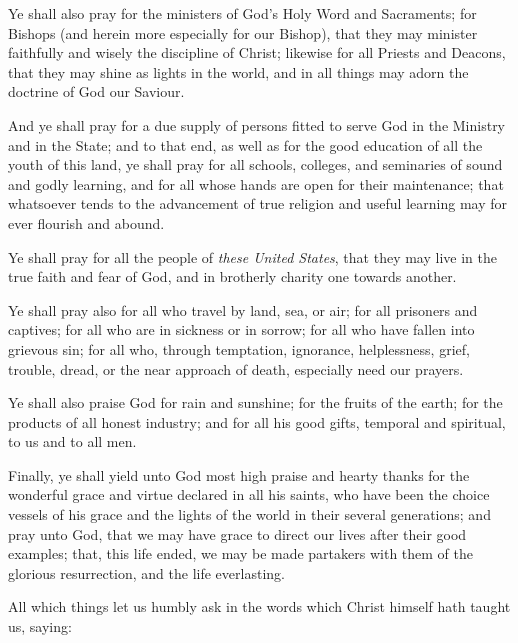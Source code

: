 Ye shall also pray for the ministers of God’s Holy Word and Sacraments; for Bishops (and herein more especially for our Bishop), that they may minister faithfully and wisely the discipline of Christ; likewise for all Priests and Deacons, that they may shine as lights in the world, and in all things may adorn the doctrine of God our Saviour.

And ye shall pray for a due supply of persons fitted to serve God in the Ministry and in the State; and to that end, as well as for the good education of all the youth of this land, ye shall pray for all schools, colleges, and seminaries of sound and godly learning, and for all whose hands are open for their maintenance; that whatsoever tends to the advancement of true religion and useful learning may for ever flourish and abound.

Ye shall pray for all the people of \emph{these United States}, that they may live in the true faith and fear of God, and in brotherly charity one towards another.

Ye shall pray also for all who travel by land, sea, or air; for all prisoners and captives; for all who are in sickness or in sorrow; for all who have fallen into grievous sin; for all who, through temptation, ignorance, helplessness, grief, trouble, dread, or the near approach of death, especially need our prayers.

Ye shall also praise God for rain and sunshine; for the fruits of the earth; for the products of all honest industry; and for all his good gifts, temporal and spiritual, to us and to all men.

Finally, ye shall yield unto God most high praise and hearty thanks for the wonderful grace and virtue declared in all his saints, who have been the choice vessels of his grace and the lights of the world in their several generations; and pray unto God, that we may have grace to direct our lives after their good examples; that, this life ended, we may be made partakers with them of the glorious resurrection, and the life everlasting.

All which things let us humbly ask in the words which Christ himself hath taught us, saying:

\ourFather
 
\medskip

\centerline{}


